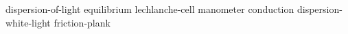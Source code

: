 dispersion-of-light
equilibrium
lechlanche-cell
manometer
conduction
dispersion-white-light
friction-plank


